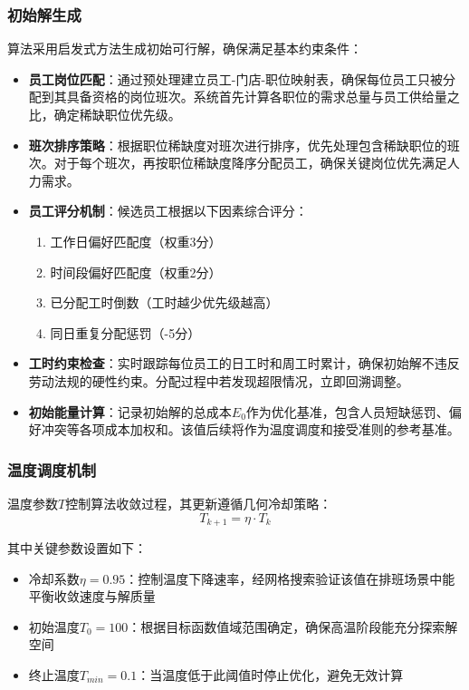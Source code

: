 \documentclass{ctexart}
\begin{document}
\subsubsection{初始解生成}
算法采用启发式方法生成初始可行解，确保满足基本约束条件：
\begin{itemize}
    \item \textbf{员工岗位匹配}：通过预处理建立员工-门店-职位映射表，确保每位员工只被分配到其具备资格的岗位班次。系统首先计算各职位的需求总量与员工供给量之比，确定稀缺职位优先级。
    
    \item \textbf{班次排序策略}：根据职位稀缺度对班次进行排序，优先处理包含稀缺职位的班次。对于每个班次，再按职位稀缺度降序分配员工，确保关键岗位优先满足人力需求。
    
    \item \textbf{员工评分机制}：候选员工根据以下因素综合评分：
    \begin{enumerate}
        \item 工作日偏好匹配度（权重3分）
        \item 时间段偏好匹配度（权重2分） 
        \item 已分配工时倒数（工时越少优先级越高）
        \item 同日重复分配惩罚（-5分）
    \end{enumerate}
    
    \item \textbf{工时约束检查}：实时跟踪每位员工的日工时和周工时累计，确保初始解不违反劳动法规的硬性约束。分配过程中若发现超限情况，立即回溯调整。
    
    \item \textbf{初始能量计算}：记录初始解的总成本$E_0$作为优化基准，包含人员短缺惩罚、偏好冲突等各项成本加权和。该值后续将作为温度调度和接受准则的参考基准。
\end{itemize}


\subsubsection{温度调度机制}
温度参数$T$控制算法收敛过程，其更新遵循几何冷却策略：
\begin{equation}
T_{k+1} = \eta \cdot T_k
\end{equation}

其中关键参数设置如下：
\begin{itemize}
    \item 冷却系数$\eta=0.95$：控制温度下降速率，经网格搜索验证该值在排班场景中能平衡收敛速度与解质量
    \item 初始温度$T_0=100$：根据目标函数值域范围确定，确保高温阶段能充分探索解空间
    \item 终止温度$T_{min}=0.1$：当温度低于此阈值时停止优化，避免无效计算
\end{itemize}
\end{document}
